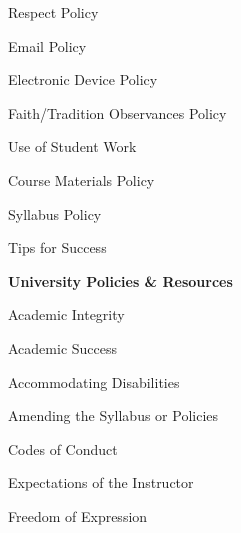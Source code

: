 \documentclass[11pt,letterpaper]{article}
\begin{document}
\begin{minipage}[t]{0.45\textwidth}
\hspace{0.3cm} Respect Policy \dotfill \pageref{respect} \par
\hspace{0.3cm} Email Policy \dotfill \pageref{email_policy} \par 
\hspace{0.3cm} Electronic Device Policy \dotfill \pageref{electronic} \par
\hspace{0.3cm} Faith/Tradition Observances Policy \dotfill \pageref{faith} \par
\end{minipage} \hfill \begin{minipage}[t]{0.45\textwidth} \par %
\hspace{0.3cm} Use of Student Work \dotfill \pageref{std_work} \par
\hspace{0.3cm} Course Materials Policy \dotfill \pageref{copyright} \par
\hspace{0.3cm} Syllabus Policy \dotfill \pageref{syllabus} \par
\hspace{0.3cm} Tips for Success \dotfill \pageref{tips} \par
{\bfseries\color{scred} University Policies \& Resources} \dotfill \pageref{univ_policies} \par
\hspace{0.3cm} Academic Integrity \dotfill \pageref{univ_academicintegrity} \par
\hspace{0.3cm} Academic Success \dotfill \pageref{univ_success} \par
\hspace{0.3cm} Accommodating Disabilities \dotfill \pageref{univ_ada} \par
\hspace{0.3cm} Amending the Syllabus or Policies \dotfill \pageref{univ_amending} \par
\hspace{0.3cm} Codes of Conduct \dotfill \pageref{univ_conduct} \par
\hspace{0.3cm} Expectations of the Instructor \dotfill \pageref{univ_instructorexp} \par
\hspace{0.3cm} Freedom of Expression \dotfill \pageref{univ_freedexpression} \par

\end{minipage}
\end{document}
